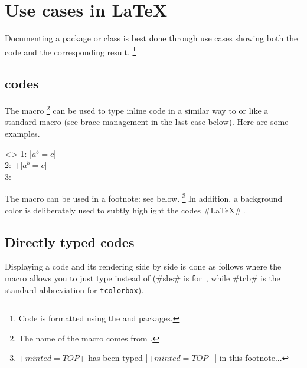 \section{Use cases in \LaTeX}
\label{tutodoc-listing-latex}

Documenting a package or class is best done through use cases showing both the code and the corresponding result.
\footnote{
    Code is formatted using the  and  packages.
}


\subsection{ codes}
\label{tutodoc-listing-latex-inline}

The  macro
\footnote{
    The name of the macro  comes from .
}
can be used to type inline code in a similar way to  or like a standard macro (see brace management in the last case below).
Here are some examples.


\begin{tdoclatex}<>
    1: \tdoclatexin|$a^b = c$|               \\
    2: \tdoclatexin+\tdoclatexin|$a^b = c$|+ \\
    3: 
\end{tdoclatex}


\begin{tdocnote}
    The  macro can be used in a footnote: see below.
    \footnote{
        \tdoclatexin+$minted = TOP$+ has been typed \tdoclatexin|\tdoclatexin+$minted = TOP$+| in this footnote...
    }
    In addition, a background color is deliberately used to subtly highlight the codes \tdoclatexin#\LaTeX#\,.
\end{tdocnote}




\subsection{Directly typed codes}

\begin{tdocexa}
    Displaying a code and its rendering side by side is done as follows where the macro  allows you to just type  instead of  (\tdoclatexin#sbs# is for \,, while \tdoclatexin#tcb# is the standard abbreviation for \texttt{tcolorbox}).


\end{tdocexa}


